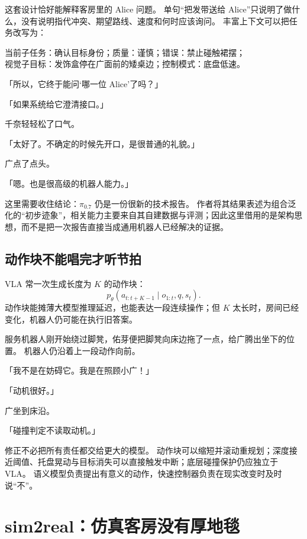这套设计恰好能解释客房里的 Alice 问题。
单句“把发带送给 Alice”只说明了做什么，没有说明指代冲突、期望路线、速度和何时应该询问。
丰富上下文可以把任务改写为：

\begin{center}
当前子任务：确认目标身份；质量：谨慎；错误：禁止碰触裙摆；\\
视觉子目标：发饰盒停在广面前的矮桌边；控制模式：底盘低速。
\end{center}

「所以，它终于能问‘哪一位 Alice’了吗？」

「如果系统给它澄清接口。」

千奈轻轻松了口气。

「太好了。不确定的时候先开口，是很普通的礼貌。」

广点了点头。

「嗯。也是很高级的机器人能力。」

这里需要收住结论：$\pi_{0.7}$ 仍是一份很新的技术报告。
作者将其结果表述为组合泛化的“初步迹象”，相关能力主要来自其自建数据与评测；因此这里借用的是架构思想，而不是把一次报告直接当成通用机器人已经解决的证据。

\subsection{动作块不能唱完才听节拍}

VLA 常一次生成长度为 $K$ 的动作块：
\begin{equation}
p_\theta(a_{t:t+K-1}\mid o_{1:t},q,s_t).
\end{equation}
动作块能摊薄大模型推理延迟，也能表达一段连续操作；但 $K$ 太长时，房间已经变化，机器人仍可能在执行旧答案。

服务机器人刚开始绕过脚凳，佑芽便把脚凳向床边拖了一点，给广腾出坐下的位置。
机器人仍沿着上一段动作向前。

「我不是在妨碍它。我是在照顾小广！」

「动机很好。」

广坐到床沿。

「碰撞判定不读取动机。」

修正不必把所有责任都交给更大的模型。
动作块可以缩短并滚动重规划；深度接近阈值、托盘晃动与目标消失可以直接触发中断；底层碰撞保护仍应独立于 VLA。
语义模型负责提出有意义的动作，快速控制器负责在现实改变时及时说“不”。

\section{sim2real：仿真客房没有厚地毯}

